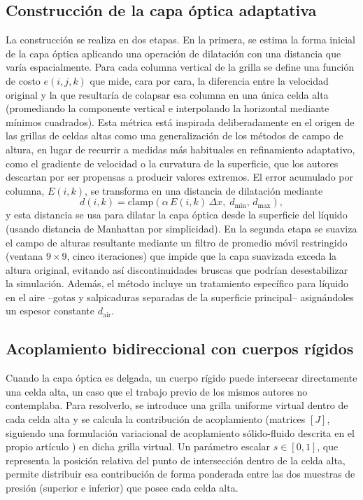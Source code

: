 \documentclass[sigconf,nonacm]{acmart}
\begin{document}
\subsection{Construcción de la capa óptica adaptativa}
La construcción se realiza en dos etapas. En la primera, se estima la forma inicial de la capa óptica aplicando una operación de dilatación con una distancia que varía espacialmente. Para cada columna vertical de la grilla se define una función de costo $e(i,j,k)$ que mide, cara por cara, la diferencia entre la velocidad original y la que resultaría de colapsar esa columna en una única celda alta (promediando la componente vertical e interpolando la horizontal mediante mínimos cuadrados). Esta métrica está inspirada deliberadamente en el origen de las grillas de celdas altas como una generalización de los métodos de campo de altura, en lugar de recurrir a medidas más habituales en refinamiento adaptativo, como el gradiente de velocidad o la curvatura de la superficie, que los autores descartan por ser propensas a producir valores extremos. El error acumulado por columna, $E(i,k)$, se transforma en una distancia de dilatación mediante
\[
d(i,k)=\mathrm{clamp}\!\left(\alpha\, E(i,k)\,\Delta x,\; d_{\min},\, d_{\max}\right),
\]
y esta distancia se usa para dilatar la capa óptica desde la superficie del líquido (usando distancia de Manhattan por simplicidad). En la segunda etapa se suaviza el campo de alturas resultante mediante un filtro de promedio móvil restringido (ventana $9\times9$, cinco iteraciones) que impide que la capa suavizada exceda la altura original, evitando así discontinuidades bruscas que podrían desestabilizar la simulación. Además, el método incluye un tratamiento específico para líquido en el aire --gotas y salpicaduras separadas de la superficie principal-- asignándoles un espesor constante $d_{\mathrm{air}}$.

\subsection{Acoplamiento bidireccional con cuerpos rígidos}
Cuando la capa óptica es delgada, un cuerpo rígido puede intersecar directamente una celda alta, un caso que el trabajo previo de los mismos autores no contemplaba. Para resolverlo, se introduce una grilla uniforme virtual dentro de cada celda alta y se calcula la contribución de acoplamiento (matrices $[J]$, siguiendo una formulación variacional de acoplamiento sólido-fluido descrita en el propio artículo \cite{narita2026}) en dicha grilla virtual. Un parámetro escalar $s\in[0,1]$, que representa la posición relativa del punto de intersección dentro de la celda alta, permite distribuir esa contribución de forma ponderada entre las dos muestras de presión (superior e inferior) que posee cada celda alta.
\end{document}
